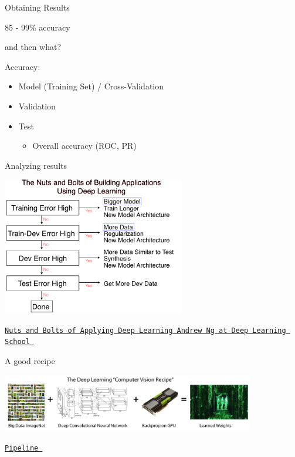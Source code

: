 \documentclass[12pt,t]{beamer}
\begin{document}
\begin{frame}[c]{Obtaining Results}

\pause

85 - 99\% accuracy
\pause

and then what?
\pause

Accuracy:
\begin{itemize}
	\item Model (Training Set) / Cross-Validation \pause
	\item Validation \pause
	\item Test \pause
		\begin{itemize}
		\item Overall accuracy (ROC, PR)
		\end{itemize}
\end{itemize} 

\end{frame}

\begin{frame}[c]{Analyzing results}

\includegraphics[height=60mm]{Figs/checklist.png}

\hfill
{\footnotesize \lolit
\href{https://www.youtube.com/watch?v=F1ka6a13S9I}{\tt Nuts and Bolts of Applying Deep Learning Andrew Ng at Deep Learning School }
}

\end{frame}

\begin{frame}[c]{A good recipe}

\includegraphics[height=25mm]{Figs/pipeline.png}

\hfill
{\footnotesize \lolit
\href{http://www.computervisionblog.com/2015/05/deep-learning-vs-big-data-who-owns-what.html}{\tt Pipeline }
}

\end{frame}
\end{document}
